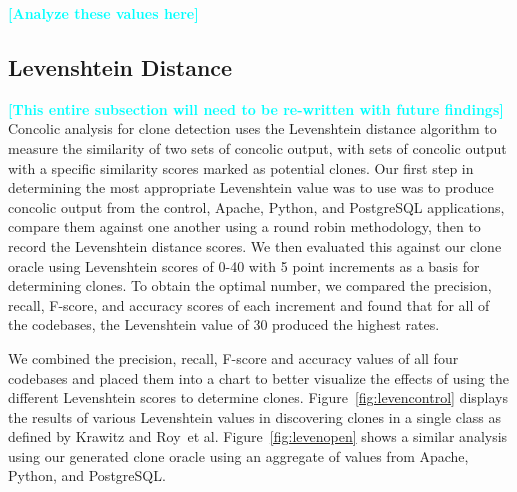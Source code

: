 \documentclass[smallextended]{svjour3}       %
\newcommand{\todo}[1]{\textcolor{cyan}{\textbf{[#1]}}}
\begin{document}
\todo{Analyze these values here}


\subsection{Levenshtein Distance}


\todo{This entire subsection will need to be re-written with future findings}
Concolic analysis for clone detection uses the Levenshtein distance algorithm to measure the similarity of two sets of concolic output, with sets of concolic output with a specific similarity scores marked as potential clones. Our first step in determining the most appropriate Levenshtein value was to use was to produce concolic output from the control, Apache, Python, and PostgreSQL applications, compare them against one another using a round robin methodology, then to record the Levenshtein distance scores. We then evaluated this against our clone oracle using Levenshtein scores of 0-40 with 5 point increments as a basis for determining clones. To obtain the optimal number, we compared the precision, recall, F-score, and accuracy scores of each increment and found that for all of the codebases, the Levenshtein value of 30 produced the highest rates.

We combined the precision, recall, F-score and accuracy values of all four codebases and placed them into a chart to better visualize the effects of using the different Levenshtein scores to determine clones. Figure~\ref{fig:levencontrol} displays the results of various Levenshtein values in discovering clones in a single class as defined by Krawitz and Roy~et al. Figure~\ref{fig:levenopen} shows a similar analysis using our generated clone oracle using an aggregate of values from Apache, Python, and PostgreSQL.
\end{document}
